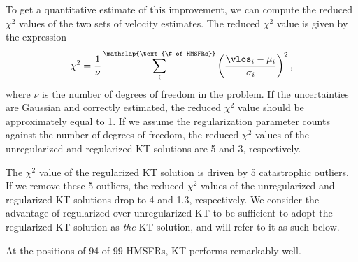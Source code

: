 To get a quantitative estimate of this improvement, we can compute the reduced $\chi^2$ values of the two sets of velocity estimates. 
The reduced $\chi^2$ value is given by the expression
\begin{equation}
\chi^2 = \frac{1}{\nu} \sum_i^{\mathclap{\text{\# of HMSFRs}}} \left(\frac{\vlos_i - \mu_i}{\sigma_i} \right)^2, 
\end{equation}
where $\nu$ is the number of degrees of freedom in the problem.
If the uncertainties are Gaussian and correctly estimated, the reduced $\chi^2$ value should be approximately equal to 1.
If we assume the regularization parameter counts against the number of degrees of freedom, the reduced $\chi^2$ values of the unregularized and regularized KT solutions are 5 and 3, respectively.

The $\chi^2$ value of the regularized KT solution is driven by 5 catastrophic outliers. 
If we remove these 5 outliers, the reduced $\chi^2$ values of the unregularized and regularized KT solutions drop to 4 and 1.3, respectively. 
We consider the advantage of regularized over unregularized KT to be sufficient to adopt the regularized KT solution as \emph{the} KT solution, and will refer to it as such below.

At the positions of 94 of 99 HMSFRs, KT performs remarkably well. 
